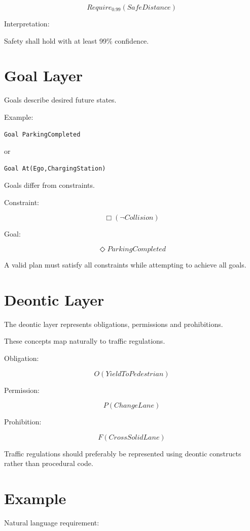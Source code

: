 \documentclass[11pt,a4paper]{article}
\begin{document}
\[
Require_{0.99}
(
SafeDistance
)
\]

Interpretation:

Safety shall hold with at least 99\% confidence.

\section{Goal Layer}

Goals describe desired future states.

Example:

\begin{verbatim}
Goal ParkingCompleted
\end{verbatim}

or

\begin{verbatim}
Goal At(Ego,ChargingStation)
\end{verbatim}

Goals differ from constraints.

Constraint:

\[
\Box(\neg Collision)
\]

Goal:

\[
\Diamond ParkingCompleted
\]

A valid plan must satisfy all constraints while attempting to achieve
all goals.

\section{Deontic Layer}

The deontic layer represents obligations, permissions and
prohibitions.

These concepts map naturally to traffic regulations.

Obligation:

\[
O(YieldToPedestrian)
\]

Permission:

\[
P(ChangeLane)
\]

Prohibition:

\[
F(CrossSolidLane)
\]

Traffic regulations should preferably be represented using deontic
constructs rather than procedural code.

\section{Example}

Natural language requirement:
\end{document}

